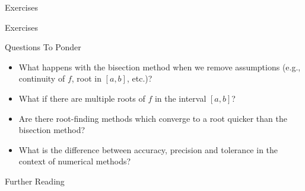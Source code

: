 \documentclass[12pt,aspectratio=169,envcountset]{beamer}
\DeclarePairedDelimiter{\abs}{\lvert}{\rvert}
\begin{document}

\begin{frame}{Exercises}
\end{frame}

\begin{frame}{Exercises}
\end{frame}

\begin{frame}{Questions To Ponder}
  \begin{itemize}
    \item What happens with the bisection method when we remove assumptions
      (e.g., continuity of $f$, root in $[a,b]$, etc.)?
    \item What if there are multiple roots of $f$ in the interval $[a,b]$?
    \item Are there root-finding methods which converge to a root quicker than
      the bisection method?
    \item What is the difference between accuracy, precision and tolerance in
      the context of numerical methods?
  \end{itemize}
\end{frame}

\begin{frame}{Further Reading}
  \nocite{burden2015numerical}
  \printbibliography
\end{frame}

\appendix
\end{document}
